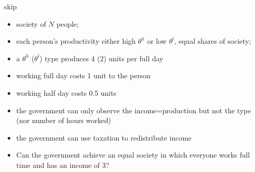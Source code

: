 \documentclass[english,handout,10pt]{beamer}		%
\def\lyxframeend{} %
\newcommand\soutred{\bgroup\markoverwith
	{\textcolor{red}{\rule[0.55ex]{2pt}{0.8pt}}}\ULon}
\begin{document}
\lyxframeend


\begin{example}[skip]
	skip
\end{example}
\lyxframeend


\begin{example}[Communism]
	\begin{itemize}
		\item society of $N$ people;
		\item each person's productivity either high $\theta^h$ or low $\theta^l$, equal shares of society;
		\item a $\theta^{h}$ ($\theta^{l}$) type produces 4 (2) units per full day
		\item working full day costs 1 unit to the person
		\item working half day costs 0.5 units
		\item the government can only observe the income=production but not the type (nor number of hours worked)
		\item the government can use taxation to redistribute income
		\item Can the government achieve an equal society in which everyone works full time and has an income of 3?
	\end{itemize}
\end{example}
\lyxframeend
\end{document}
